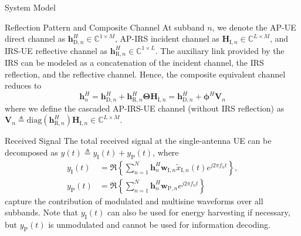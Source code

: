 \documentclass[journal]{IEEEtran}
\begin{document}
\begin{section}{System Model}
\begin{subsection}{Reflection Pattern and Composite Channel}
			At subband $n$, we denote the AP-UE direct channel as $\boldsymbol{h}_{\mathrm{D},n}^H \in \mathbb{C}^{1 \times M}$, AP-IRS incident channel as $\boldsymbol{H}_{\mathrm{I},n} \in \mathbb{C}^{L \times M}$, and IRS-UE reflective channel as $\boldsymbol{h}_{\mathrm{R},n}^H \in \mathbb{C}^{1 \times L}$. The auxiliary link provided by the IRS can be modeled as a concatenation of the incident channel, the IRS reflection, and the reflective channel. Hence, the composite equivalent channel reduces to
			\begin{equation}\label{eq:h_n}
				\boldsymbol{h}_{n}^H = \boldsymbol{h}_{\mathrm{D},n}^H + \boldsymbol{h}_{\mathrm{R},n}^H \boldsymbol{\Theta} \boldsymbol{H}_{\mathrm{I},n} = \boldsymbol{h}_{\mathrm{D},n}^H + \boldsymbol{\phi}^H \boldsymbol{V}_{n}
			\end{equation}
			where we define the cascaded AP-IRS-UE channel (without IRS reflection) as $\boldsymbol{V}_{n} \triangleq \mathrm{diag}(\boldsymbol{h}_{\mathrm{R},n}^H)\boldsymbol{H}_{\mathrm{I},n} \in \mathbb{C}^{L \times M}$.
		\end{subsection}


		\begin{subsection}{Received Signal}
			The total received signal at the single-antenna UE can be decomposed as $y(t) \triangleq y_{\mathrm{I}}(t)+y_\mathrm{P}(t)$, where
			\begin{align}
				y_{\mathrm{I}}(t) & = \Re\left\{\sum_{n=1}^N{\boldsymbol{h}_{n}^H}{\boldsymbol{w}_{\mathrm{I},n}\tilde{x}_{\mathrm{I},n}(t)}{e^{j2{\pi}{f_n}{t}}}\right\},\label{eq:y_I}\\
				y_{\mathrm{P}}(t) & = \Re\left\{\sum_{n=1}^N{\boldsymbol{h}_{n}^H}\boldsymbol{w}_{\mathrm{P},n}{e^{j2{\pi}{f_n}{t}}}\right\}\label{eq:y_P}
			\end{align}
			capture the contribution of modulated and multisine waveforms over all subbands. Note that $y_{\mathrm{I}}(t)$ can also be used for energy harvesting if necessary, but $y_{\mathrm{P}}(t)$ is unmodulated and cannot be used for information decoding.
		\end{subsection}



\end{section}
\end{document}
